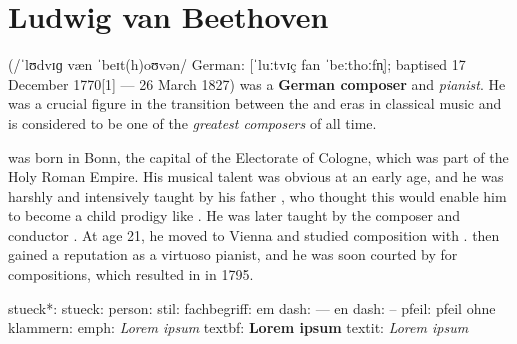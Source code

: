 \documentclass{article}
\begin{document}
\section{Ludwig van Beethoven}

 (/ˈlʊdvɪɡ væn ˈbeɪt(h)oʊvən/  German:
[ˈluːtvɪç fan ˈbeːthoːfn̩]; baptised 17 December 1770[1] --- 26 March
1827) was a \textbf{German composer} and \textit{pianist}. He was a
crucial figure in the transition between the  and
 eras in classical music and is considered to be one of
the \emph{greatest composers} of all time.

 was born in Bonn, the capital of the Electorate of
Cologne, which was part of the Holy Roman Empire. His musical talent was
obvious at an early age, and he was harshly and intensively taught by
his father , who thought this would enable
him to become a child prodigy like . He was later taught
by the composer and conductor . At age
21, he moved to Vienna and studied composition with .  then gained a reputation as a virtuoso
pianist, and he was soon courted by  for compositions, which resulted in  in 1795.

stueck*: 
stueck: 
person: 
stil: 
fachbegriff: 
em dash: ---
en dash: --
pfeil: \pfeil{}
pfeil ohne klammern: \pfeil{}
emph: \emph{Lorem ipsum}
textbf: \textbf{Lorem ipsum}
textit: \textit{Lorem ipsum}
\end{document}
